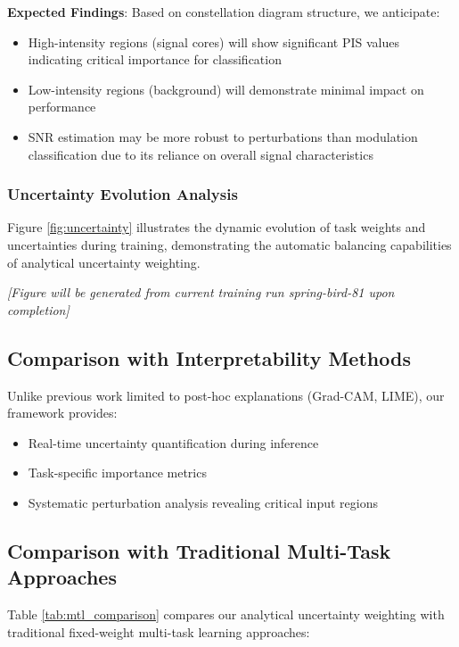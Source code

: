 \documentclass[conference]{IEEEtran}
\begin{document}
\textbf{Expected Findings}: Based on constellation diagram structure, we anticipate:
\begin{itemize}
\item High-intensity regions (signal cores) will show significant PIS values indicating critical importance for classification
\item Low-intensity regions (background) will demonstrate minimal impact on performance
\item SNR estimation may be more robust to perturbations than modulation classification due to its reliance on overall signal characteristics
\end{itemize}

\subsubsection{Uncertainty Evolution Analysis}

Figure \ref{fig:uncertainty} illustrates the dynamic evolution of task weights and uncertainties during training, demonstrating the automatic balancing capabilities of analytical uncertainty weighting.

\textit{[Figure will be generated from current training run spring-bird-81 upon completion]}

\subsection{Comparison with Interpretability Methods}

Unlike previous work limited to post-hoc explanations (Grad-CAM, LIME), our framework provides:
\begin{itemize}
\item Real-time uncertainty quantification during inference
\item Task-specific importance metrics
\item Systematic perturbation analysis revealing critical input regions
\end{itemize}

\subsection{Comparison with Traditional Multi-Task Approaches}

Table \ref{tab:mtl_comparison} compares our analytical uncertainty weighting with traditional fixed-weight multi-task learning approaches:
\end{document}
